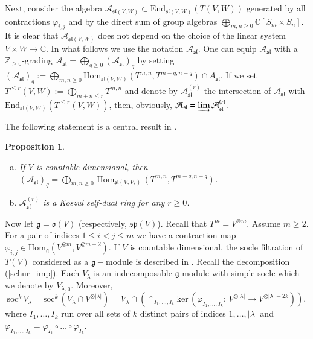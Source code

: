 \documentclass[10pt]{amsart}
\newcounter{theorem}
\newtheorem{prop}[theo]{Proposition}
\newcommand {\ZZ} {\mathbb {Z}}
\newcommand {\CC} {\mathbb {C}}
\renewcommand{\sp}{\mathfrak{sp}}
\renewcommand{\sl}{\mathfrak{sl}}
\newcommand{\oo}{\mathfrak{o}}
\renewcommand{\gg}{\mathfrak{g}}
\renewcommand {\phi} {\varphi}
\newcommand{\Soc}{\mathrm{soc}}
\newcommand{\Ker}{\mathrm{ker}}
\newcommand{\Hom}{\mathrm{Hom}}
\newcommand{\End}{\mathrm{End}}
\begin{document}
Next, consider the algebra $\mathcal
A_{\sl(V,W)}\subset \End_{\sl(V,W)}(T(V,W))$ generated by all
contractions $\phi_{i,j}$ and 
by the direct sum of group algebras $\bigoplus_{m,n\geq  0}\CC[S_m\times S_n]$. It is clear that $\mathcal A_{\sl(V,W)}$ does
not depend on the choice of the linear system $V \times W \rightarrow\CC$. 
In what follows we use the notation $\mathcal A_{\sl}$. One can equip
$\mathcal A_{\sl}$ with a 
$\ZZ_{\geq 0}$-grading  $\mathcal A_{\sl}=\bigoplus_{q\geq 0}
(\mathcal A_{\sl})_q$ by setting 
$(\mathcal A_{\sl})_q:=\bigoplus_{m,n\geq
  0}{\mathrm{Hom}_{\sl(V,W)}}(T^{m,n},T^{m-q,n-q})\cap A_{\sl}$. If we
set 
$T^{\leq r}(V,W):=\bigoplus_{m+n\leq r} T^{m,n}$ and denote by
$\mathcal A_{\sl}^{(r)}$ the intersection of  
$\mathcal A_{\sl}$ with $\End_{\sl(V,W)}(T^{\leq r}(V,W))$, then,
obviously,   
$\mathcal A_{\sl}=\varinjlim \mathcal A_{\sl}^{(r)}$.

The following statement is a central result in \cite{DPS}.

\begin{prop}\label{Koszul1} 
\begin{enumerate}[a)]
 \item If $V$ is countable dimensional, then 
$(\mathcal A_{\sl})_q = \bigoplus_{m,n \geq 0}\,\Hom_{\sl(V,V_*)}\,(T^{m,n},T^{m-q,n-q})$.
 \item $\mathcal A_{\sl}^{(r)}$ is a Koszul self-dual ring for any $r \geq 0$.
\end{enumerate}
\end{prop}

Now let $\gg=\oo(V)$ (respectively, $\sp(V)$). Recall that $T^m =
V^{\otimes m}$. Assume $m\geq 2$. For a pair of indices 
$1\leq i<j\leq m$ we have a contraction map
$\varphi_{i,j}\in\Hom_\gg(V^{\otimes m},V^{\otimes m-2})$. 
If $V$ is countable dimensional, the socle filtration of $T(V)$
considered as a $\gg-$module is described in
\cite{pstyr}. Recall the decomposition (\ref{schur_imp}). Each
$V_\lambda$ is an indecomposable $\gg$-module with simple socle which 
we denote by $V_{\lambda,\gg}$. Moreover, 
$$\Soc^k\,V_{\lambda} = \Soc^k\,(V_{\lambda} \cap
V^{\otimes|\lambda|}) = V_{\lambda} \cap
(\cap_{I_1,\dots,I_k}\Ker\,(\phi_{I_1,\dots,I_k}:\,V^{\otimes|\lambda|}\rightarrow
V^{\otimes|\lambda|-2k})),$$ where $I_1,\dots,I_k$ run over all sets
of $k$ distinct pairs of indices $1,\dots,|\lambda|$ and $\phi_{I_1,\dots,I_k} = \phi_{I_1} \circ \dots \circ \phi_{I_k}$. 
\end{document}
